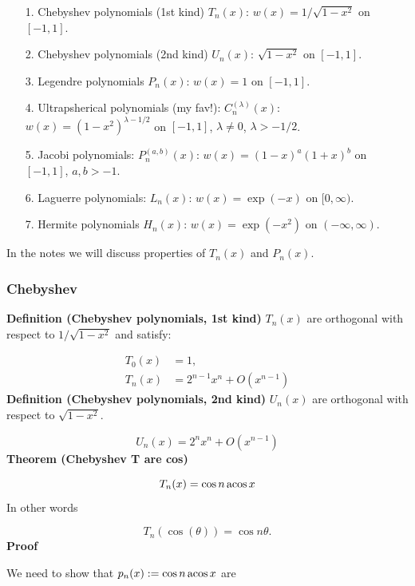 \documentclass[12pt,a4paper]{article}
\begin{document}
\begin{itemize}
\item[1. ] Chebyshev polynomials (1st kind) $T_n(x)$: $w(x) = 1/\sqrt{1-x^2}$ on $[-1,1]$.


\item[2. ] Chebyshev polynomials (2nd kind) $U_n(x)$: $\sqrt{1-x^2}$ on $[-1,1]$.


\item[3. ] Legendre polynomials $P_n(x)$: $w(x) = 1$ on $[-1,1]$.


\item[4. ] Ultrapsherical polynomials (my fav!): $C_n^{(\ensuremath{\lambda})}(x)$: $w(x) = (1-x^2)^{\ensuremath{\lambda}-1/2}$ on $[-1,1]$, $\ensuremath{\lambda} \ensuremath{\ne} 0$, $\ensuremath{\lambda} > -1/2$.


\item[5. ] Jacobi polynomials: $P_n^{(a,b)}(x)$: $w(x) = (1-x)^a (1+x)^b$ on $[-1,1]$, $a,b > -1$.


\item[6. ] Laguerre polynomials: $L_n(x)$: $w(x) = \exp(-x)$ on $[0,\ensuremath{\infty})$.


\item[7. ] Hermite polynomials $H_n(x)$: $w(x) = \exp(-x^2)$  on $(-\ensuremath{\infty},\ensuremath{\infty})$.

\end{itemize}
In the notes we will discuss properties of $T_n(x)$ and $P_n(x)$.

\subsubsection{Chebyshev}
\textbf{Definition (Chebyshev polynomials, 1st kind)} $T_n(x)$ are orthogonal with respect to $1/\sqrt{1-x^2}$ and satisfy:


\begin{align*}
T_0(x) &= 1, \\
T_n(x) &= 2^{n-1} x^n + O(x^{n-1})
\end{align*}
\textbf{Definition (Chebyshev polynomials, 2nd kind)} $U_n(x)$ are orthogonal with respect to $\sqrt{1-x^2}$.

\[
U_n(x) = 2^n x^n + O(x^{n-1})
\]
\textbf{Theorem (Chebyshev T are cos)}

\[
T_n(x) = \cos n\, {\rm acos}\, x
\]
In other words

\[
T_n(\cos(\ensuremath{\theta})) = \cos n \ensuremath{\theta}.
\]
\textbf{Proof}

We need to show that $p_n(x) := \cos n\, {\rm acos}\, x$ are
\end{document}
